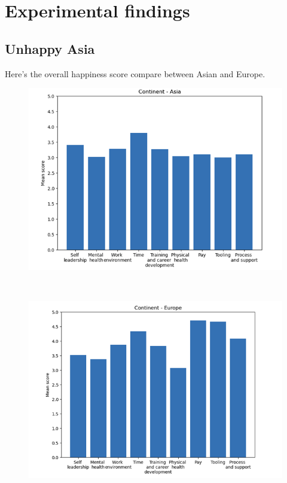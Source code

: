 \documentclass[12pt]{article}
\begin{document}
\section*{Experimental findings}

\subsection*{Unhappy Asia}

Here’s the overall happiness score compare between Asian and Europe.

\begin{figure}[h]
    \centering
    \includegraphics[scale=1]{asia.png}
    \label{asia}
\end{figure} \\

\begin{figure}[h]
    \centering
    \includegraphics[scale=1]{europe.png}
    \label{europe}
\end{figure} 
\end{document}
